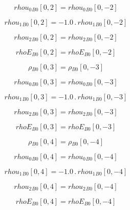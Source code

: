 \documentclass{article}
\begin{document}
\begin{dmath}{rhou_{0}{_{B0}}}[{0,2}] = {rhou_{0}{_{B0}}}[{0,-2}]\end{dmath}

\begin{dmath}{rhou_{1}{_{B0}}}[{0,2}] = - 1.0 \,.\, {rhou_{1}{_{B0}}}[{0,-2}]\end{dmath}

\begin{dmath}{rhou_{2}{_{B0}}}[{0,2}] = {rhou_{2}{_{B0}}}[{0,-2}]\end{dmath}

\begin{dmath}{rhoE{_{B0}}}[{0,2}] = {rhoE{_{B0}}}[{0,-2}]\end{dmath}

\begin{dmath}{\rho{_{B0}}}[{0,3}] = {\rho{_{B0}}}[{0,-3}]\end{dmath}

\begin{dmath}{rhou_{0}{_{B0}}}[{0,3}] = {rhou_{0}{_{B0}}}[{0,-3}]\end{dmath}

\begin{dmath}{rhou_{1}{_{B0}}}[{0,3}] = - 1.0 \,.\, {rhou_{1}{_{B0}}}[{0,-3}]\end{dmath}

\begin{dmath}{rhou_{2}{_{B0}}}[{0,3}] = {rhou_{2}{_{B0}}}[{0,-3}]\end{dmath}

\begin{dmath}{rhoE{_{B0}}}[{0,3}] = {rhoE{_{B0}}}[{0,-3}]\end{dmath}

\begin{dmath}{\rho{_{B0}}}[{0,4}] = {\rho{_{B0}}}[{0,-4}]\end{dmath}

\begin{dmath}{rhou_{0}{_{B0}}}[{0,4}] = {rhou_{0}{_{B0}}}[{0,-4}]\end{dmath}

\begin{dmath}{rhou_{1}{_{B0}}}[{0,4}] = - 1.0 \,.\, {rhou_{1}{_{B0}}}[{0,-4}]\end{dmath}

\begin{dmath}{rhou_{2}{_{B0}}}[{0,4}] = {rhou_{2}{_{B0}}}[{0,-4}]\end{dmath}

\begin{dmath}{rhoE{_{B0}}}[{0,4}] = {rhoE{_{B0}}}[{0,-4}]\end{dmath}
\end{document}
